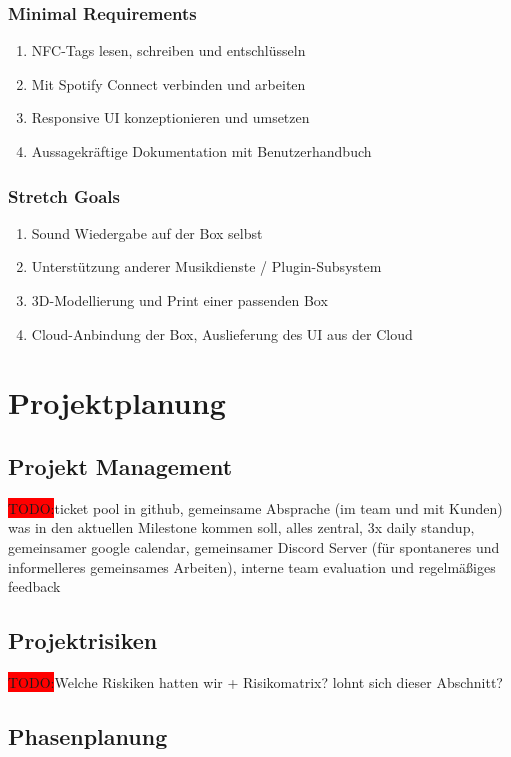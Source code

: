 \documentclass[10pt, a4paper]{article}
\begin{document}
\subsubsection{Minimal Requirements}
\begin{enumerate}
  \item NFC-Tags lesen, schreiben und entschlüsseln
  \item Mit Spotify Connect verbinden und arbeiten
  \item Responsive UI konzeptionieren und umsetzen
  \item Aussagekräftige Dokumentation mit Benutzerhandbuch
\end{enumerate}
\subsubsection{Stretch Goals}
\begin{enumerate}
  \item Sound Wiedergabe auf der Box selbst
  \item Unterstützung anderer Musikdienste / Plugin-Subsystem
  \item 3D-Modellierung und Print einer passenden Box
  \item Cloud-Anbindung der Box, Auslieferung des UI aus der Cloud
\end{enumerate}

\section{Projektplanung}

\subsection{Projekt Management}
\colorbox{red}{TODO:}ticket pool in github, gemeinsame Absprache (im team und mit Kunden) was in den aktuellen Milestone kommen soll, alles zentral, 3x daily standup, gemeinsamer google calendar, gemeinsamer Discord Server (für spontaneres und informelleres gemeinsames Arbeiten), interne team evaluation und regelmäßiges feedback

\subsection{Projektrisiken}
\colorbox{red}{TODO:}Welche Riskiken hatten wir + Risikomatrix? lohnt sich dieser Abschnitt?

\subsection{Phasenplanung}
\end{document}
